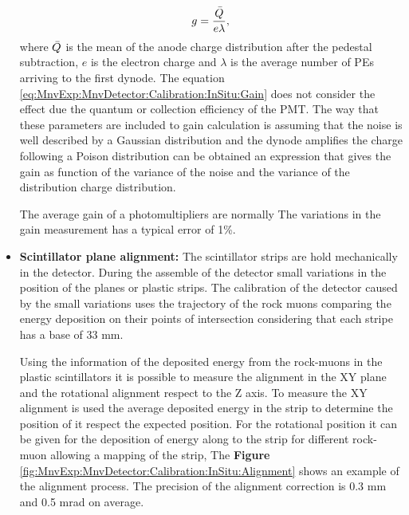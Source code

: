 \begin{itemize}
    \begin{equation}
        g=\frac{\Bar{Q}}{e\lambda},
        \label{eq:MnvExp:MnvDetector:Calibration:InSitu:Gain}
    \end{equation}
    where $\Bar{Q}$ is the mean of the anode charge distribution after the pedestal subtraction, $e$ is the electron charge and $\lambda$ is the average number of PEs arriving to the first dynode. The equation \ref{eq:MnvExp:MnvDetector:Calibration:InSitu:Gain} does not consider the effect due the quantum or collection efficiency of the PMT. The way that these parameters are included to gain calculation is assuming that the noise is well described by a Gaussian distribution and the dynode amplifies the charge following a Poison distribution can be obtained an expression that gives the gain as function of the variance of the noise and the variance of the distribution charge distribution.
    
    The average gain of a photomultipliers are normally  The variations in the gain measurement has a typical error of 1\%. 
    
    
    \item \textbf{Scintillator plane alignment:} The scintillator strips are hold mechanically in the detector. During the assemble of the detector small variations in the position of the planes or plastic strips. The calibration of the detector caused by the small variations uses the trajectory of the rock muons comparing the energy deposition on their points of intersection considering that each stripe has a base of 33 mm. 

    Using the information of the deposited energy from the rock-muons in the plastic scintillators it is possible to measure the alignment in the XY plane and the rotational alignment respect to the Z axis. To measure the XY alignment is used the average deposited energy in the strip to determine the position of it respect the expected position. For the rotational position it can be given for the deposition of energy along to the strip for different rock-muon allowing a mapping of the strip, The \textbf{Figure} \ref{fig:MnvExp:MnvDetector:Calibration:InSitu:Alignment} shows an example of the alignment process. The precision of the alignment correction is 0.3 mm and 0.5 mrad on average.
    

\end{itemize}
